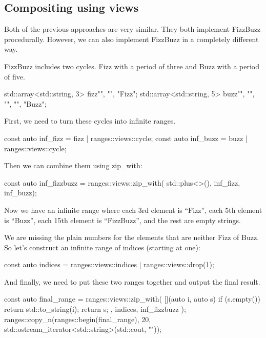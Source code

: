 \subsection{Compositing using views}

Both of the previous approaches are very similar. They both implement FizzBuzz procedurally. However, we can also implement FizzBuzz in a completely different way.

FizzBuzz includes two cycles. Fizz with a period of three and Buzz with a period of five.

\begin{box-note}
\begin{cppcode}
std::array<std::string, 3> fizz{"", "", "Fizz"};
std::array<std::string, 5> buzz{"", "", "", "", "Buzz"};
\end{cppcode}
\end{box-note}

First, we need to turn these cycles into infinite ranges.

\begin{box-note}
\begin{cppcode}
const auto inf_fizz = fizz | ranges::views::cycle;
const auto inf_buzz = buzz | ranges::views::cycle;
\end{cppcode}
\end{box-note}

Then we can combine them using zip\_with:

\begin{box-note}
\begin{cppcode}
const auto inf_fizzbuzz = ranges::views::zip_with(
    std::plus<>(), 
    inf_fizz, 
    inf_buzz);
\end{cppcode}
\end{box-note}

Now we have an infinite range where each 3rd element is “Fizz”, each 5th element is “Buzz”, each 15th element is “FizzBuzz”, and the rest are empty strings.

We are missing the plain numbers for the elements that are neither Fizz of Buzz. So let’s construct an infinite range of indices (starting at one):

\begin{box-note}
\begin{cppcode}
const auto indices = ranges::views::indices
    | ranges::views::drop(1);
\end{cppcode}
\end{box-note}

And finally, we need to put these two ranges together and output the final result.

\begin{box-note}
\begin{cppcode}
const auto final_range = ranges::views::zip_with(
    [](auto i, auto s) { 
        if (s.empty()) return std::to_string(i); 
        return s;
    },
    indices,
    inf_fizzbuzz
);
ranges::copy_n(ranges::begin(final_range), 20,
    std::ostream_iterator<std::string>(std::cout, "\n"));
\end{cppcode}
\end{box-note}